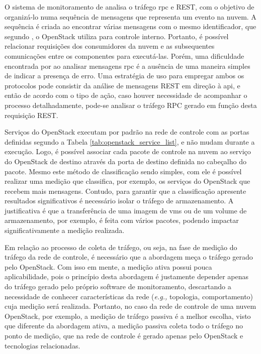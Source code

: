 O sistema de monitoramento de \cite{sharma:2015:hansel} analisa o tráfego \ac{rpc} e REST, com o objetivo de organizá-lo numa sequência de mensagens que representa um evento na nuvem.
%
A sequência é criada ao encontrar várias mensagens com o mesmo identificador, que segundo \cite{sharma:2015:hansel}, o OpenStack utiliza para controle interno.
%
Portanto, é possível relacionar requisições dos consumidores da nuvem e as subsequentes comunicações entre os componentes para executá-las.
%
Porém, uma dificuldade encontrada por \cite{sharma:2015:hansel} ao analisar mensagens \ac{rpc} é a ausência de uma maneira simples de indicar a presença de erro.
%
Uma estratégia de uso para empregar ambos os protocolos pode consistir da análise de mensagens REST em direção à \ac{api}, e então de acordo com o tipo de ação, caso houver necessidade de acompanhar o processo detalhadamente, pode-se analisar o tráfego RPC gerado em função desta requisição REST.

Serviços do OpenStack executam por padrão na rede de controle com as portas definidas segundo a Tabela \ref{tab:openstack_service_list}, e não mudam durante a execução.
%
Logo, é possível associar cada pacote de controle na nuvem ao serviço do OpenStack de destino através da porta de destino definida no cabeçalho do pacote.
%
Mesmo este método de classificação sendo simples, com ele é possível realizar uma medição que classifica, por exemplo, os serviços do OpenStack que recebem mais mensagens.
%
Contudo, para garantir que a classificação apresente resultados significativos é necessário isolar o tráfego de armazenamento.
%
A justificativa é que a transferência de uma imagem de \acp{vm} ou de um volume de armazenamento, por exemplo, é feita com vários pacotes, podendo impactar significativamente a medição realizada.

Em relação ao processo de coleta de tráfego, ou seja, na fase de medição do tráfego da rede de controle, é necessário que a abordagem meça o tráfego gerado pelo OpenStack.
%
Com isso em mente, a medição ativa possui pouca aplicabilidade, pois o princípio desta abordagem é justamente depender apenas do tráfego gerado pelo próprio software de monitoramento, descartando a necessidade de conhecer características da rede (\textit{e.g.,} topologia, comportamento) cuja medição será realizada.
%
Portanto, no caso da rede de controle de uma nuvem OpenStack, por exemplo, a medição de tráfego passiva é a melhor escolha, visto que diferente da abordagem ativa, a medição passiva coleta todo o tráfego no ponto de medição, que na rede de controle é gerado apenas pelo OpenStack e tecnologias relacionadas.

